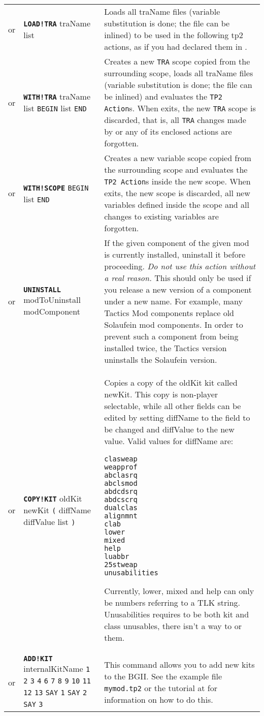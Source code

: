 \documentclass{article}
\def\ttref#1{\ahrefloc{#1}{\tt #1}}
\def\DEFINE#1{{\tt \bf #1}\label{#1}\index{#1}}
\def\t#1{{\tt #1}}
\def\Slist{{\color{red} list }}
\begin{document}
\begin{tabular}{cp{10in}|p{10in}}
  or & \DEFINE{LOAD!TRA} traName \Slist &
    Loads all traName files (variable substitution is done; the file can be inlined)
    to be used in the following tp2 actions, as if you had declared them in \ttref{LANGUAGE}. \\
  or & \DEFINE{WITH!TRA} traName \Slist \t{BEGIN} \ttref{TP2 Action} \Slist \t{END} &
    Creates a new \t{TRA} scope copied from the surrounding scope,
    loads all traName files (variable substitution is done; the file
    can be inlined) and evaluates the \t{TP2 Action}s.  When
    \ttref{WITH!TRA} exits, the new \t{TRA} scope is discarded, that
    is, all \t{TRA} changes made by \ttref{WITH!TRA} or any of its
    enclosed actions are forgotten. \\
  or & \DEFINE{WITH!SCOPE} \t{BEGIN} \ttref{TP2 Action} \Slist \t{END} &
    Creates a new variable scope copied from the surrounding scope
    and evaluates the \t{TP2 Action}s inside the new scope. When
    \ttref{WITH!SCOPE} exits, the new scope is discarded, all
    new variables defined inside the scope and all changes to existing variables
    are forgotten. \\
  or & \DEFINE{UNINSTALL} modToUninstall modComponent &
    If the given component of the given mod is currently installed,
    uninstall it before proceeding. \emph{Do not use this action without
	a real reason.} This
    should only be used if you release a new version of a component under a
    new name. For example, many Tactics Mod components replace old
    Solaufein mod components. In order to prevent such a component from
    being installed twice, the Tactics version uninstalls the Solaufein
    version.  \\
  or & \DEFINE{COPY!KIT} oldKit newKit \verb+(+ diffName diffValue \Slist
  \verb+)+ &
    Copies a copy of the oldKit kit called newKit. This copy is non-player
    selectable, while all other fields can be edited by setting diffName to
    the field to be changed and diffValue to the new value. Valid values for
    diffName are:
\begin{verbatim}
clasweap
weapprof
abclasrq
abclsmod
abdcdsrq
abdcscrq
dualclas
alignmnt
clab
lower
mixed
help
luabbr
25stweap
unusabilities
\end{verbatim}
    Currently, lower, mixed and help can only be numbers referring to a TLK
    string. Unusabilities requires to be both kit and class unusables, there
    isn't a way to \ttref{BAND} or \ttref{BOR} them.
    \\
  or & \DEFINE{ADD!KIT} internalKitName \t{\ttref{String}1}
       \t{\ttref{String}2} \t{\ttref{String}3} \t{\ttref{String}4}
       \t{\ttref{String}6} \t{\ttref{String}7} \t{\ttref{String}8}
       \t{\ttref{String}9} \t{\ttref{String}10} \t{\ttref{String}11}
       \t{\ttref{String}12} \t{\ttref{String}13} \t{SAY} \t{\ttref{text}1}
       \t{SAY} \t{\ttref{text}2} \t{SAY} \t{\ttref{text}3}
  &
    This command allows you to add new kits to the BGII.
    See the example file \t{mymod.tp2} or the tutorial at
    \ahrefurl{\url{http://gibberlings3.net/forums/index.php?showtopic=584}}
    for information on how to do this.


\end{tabular}
\end{document}
